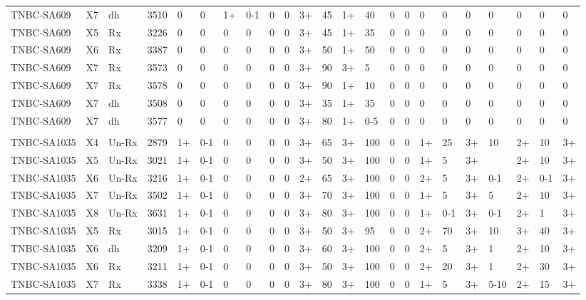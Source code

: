 \begin{landscape}
\begin{table}[]
{\begin{tabular}{lllllllllllllllllllllll}
TNBC-SA609 & X7 & dh & 3510 & 0 & 0 & 1+ & 0-1 & 0 & 0 & 3+ & 45 & 1+ & 40 & 0 & 0 & 0 & 0 & 0 & 0 & 0 & 0 & 0 \\
TNBC-SA609 & X5 & Rx & 3226 & 0 & 0 & 0 & 0 & 0 & 0 & 3+ & 45 & 1+ & 35 & 0 & 0 & 0 & 0 & 0 & 0 & 0 & 0 & 0 \\
TNBC-SA609 & X6 & Rx & 3387 & 0 & 0 & 0 & 0 & 0 & 0 & 3+ & 50 & 1+ & 50 & 0 & 0 & 0 & 0 & 0 & 0 & 0 & 0 & 0 \\
TNBC-SA609 & X7 & Rx & 3573 & 0 & 0 & 0 & 0 & 0 & 0 & 3+ & 90 & 3+ & 5 & 0 & 0 & 0 & 0 & 0 & 0 & 0 & 0 & 0 \\
TNBC-SA609 & X7 & Rx & 3578 & 0 & 0 & 0 & 0 & 0 & 0 & 3+ & 90 & 1+ & 10 & 0 & 0 & 0 & 0 & 0 & 0 & 0 & 0 & 0 \\
TNBC-SA609 & X7 & dh & 3508 & 0 & 0 & 0 & 0 & 0 & 0 & 3+ & 35 & 1+ & 35 & 0 & 0 & 0 & 0 & 0 & 0 & 0 & 0 & 0 \\
TNBC-SA609 & X7 & dh & 3577 & 0 & 0 & 0 & 0 & 0 & 0 & 3+ & 80 & 1+ & 0-5 & 0 & 0 & 0 & 0 & 0 & 0 & 0 & 0 & 0 \\
 &  &  &  &  &  &  &  &  &  &  &  &  &  &  &  &  &  &  &  &  &  &  \\
TNBC-SA1035 & X4 & Un-Rx & 2879 & 1+ & 0-1 & 0 & 0 & 0 & 0 & 3+ & 65 & 3+ & 100 & 0 & 0 & 1+ & 25 & 3+ & 10 & 2+ & 10 & 3+ \\
TNBC-SA1035 & X5 & Un-Rx & 3021 & 1+ & 0-1 & 0 & 0 & 0 & 0 & 3+ & 50 & 3+ & 100 & 0 & 0 & 1+ & 5 & 3+ &  & 2+ & 10 & 3+ \\
TNBC-SA1035 & X6 & Un-Rx & 3216 & 1+ & 0-1 & 0 & 0 & 0 & 0 & 2+ & 65 & 3+ & 100 & 0 & 0 & 2+ & 5 & 3+ & 0-1 & 2+ & 0-1 & 3+ \\
TNBC-SA1035 & X7 & Un-Rx & 3502 & 1+ & 0-1 & 0 & 0 & 0 & 0 & 3+ & 70 & 3+ & 100 & 0 & 0 & 1+ & 5 & 3+ & 5 & 2+ & 10 & 3+ \\
TNBC-SA1035 & X8 & Un-Rx & 3631 & 1+ & 0-1 & 0 & 0 & 0 & 0 & 3+ & 80 & 3+ & 100 & 0 & 0 & 1+ & 0-1 & 3+ & 0-1 & 2+ & 1 & 3+ \\
TNBC-SA1035 & X5 & Rx & 3015 & 1+ & 0-1 & 0 & 0 & 0 & 0 & 3+ & 50 & 3+ & 95 & 0 & 0 & 2+ & 70 & 3+ & 10 & 3+ & 40 & 3+ \\
TNBC-SA1035 & X6 & dh & 3209 & 1+ & 0-1 & 0 & 0 & 0 & 0 & 3+ & 60 & 3+ & 100 & 0 & 0 & 2+ & 5 & 3+ & 1 & 2+ & 10 & 3+ \\
TNBC-SA1035 & X6 & Rx & 3211 & 1+ & 0-1 & 0 & 0 & 0 & 0 & 3+ & 50 & 3+ & 100 & 0 & 0 & 2+ & 20 & 3+ & 1 & 2+ & 30 & 3+ \\
TNBC-SA1035 & X7 & Rx & 3338 & 1+ & 0-1 & 0 & 0 & 0 & 0 & 3+ & 80 & 3+ & 100 & 0 & 0 & 1+ & 5 & 3+ & 5-10 & 2+ & 15 & 3+ \\

\end{tabular}}
\end{table}
\end{landscape}
